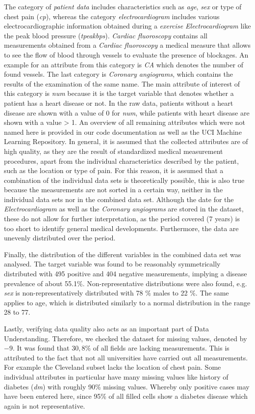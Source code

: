 The category of \textit{patient data} includes characteristics such as \textit{age}, \textit{sex} or type of chest pain (\textit{cp}), whereas the category \textit{electrocardiogram} includes various electrocardiographic information obtained during a \textit{exercise Electrocardiogram} like the peak blood pressure (\textit{tpeakbps}). \textit{Cardiac fluoroscopy} contains all measurements obtained from a \textit{Cardiac fluoroscopy} a medical measure that allows to see the flow of blood through vessels to evaluate the presence of blockages. An example for an attribute from this category is \textit{CA} which denotes the number of found vessels. The last category is \textit{Coronary angiograms}, which contains the results of the examination of the same name. The main attribute of interest of this category is \textit{num} because it is the target variable that denotes whether a patient has a heart disease or not. In the raw data, patients without a heart disease are shown with a value of 0 for \textit{num}, while patients with heart disease are shown with a value > 1. 
An overview of all remaining attributes which were not named here is provided in our code documentation as well as the UCI Machine Learning Repository\citep{janosi1988}. In general, it is assumed that the collected attributes are of high quality, as they are the result of standardized medical measurement procedures, apart from the individual characteristics described by the patient, such as the location or type of pain. For this reason, it is assumed that a combination of the individual data sets is theoretically possible, this is also true because the measurements are not sorted in a certain way, neither in the individual data sets nor in the combined data set. Although the date for the \textit{Electrocardiogram} as well as the \textit{Coronary angiograms} are stored in the dataset, these do not allow for further interpretation, as the period covered (7 years) is too short to identify general medical developments. Furthermore, the data are unevenly distributed over the period. 

Finally, the distribution of the different variables in the combined data set was analysed. The target variable was found to be reasonably symmetrically distributed with 495 positive and 404 negative measurements, implying a disease prevalence of about 55.1\%. Non-representative distributions were also found, e.g. \textit{sex} is non-representatively distributed with 78 \% males to 22 \%. The same applies to age, which is distributed similarly to a normal distribution in the range 28 to 77.  

Lastly, verifying data quality also acts as an important part of Data Understanding. Therefore, we checked the dataset for missing values, denoted by $-9$. It was found that $30,8\%$ of all fields are lacking measurements. This is attributed to the fact that not all universities have carried out all measurements. For example the Cleveland subset lacks the location of chest pain. Some individual attributes in particular have many missing values like history of diabetes (\textit{dm}) with roughly 90\% missing values. Whereby only positive cases may have been entered here, since 95\% of all filled cells show a diabetes disease which again is not representative. 